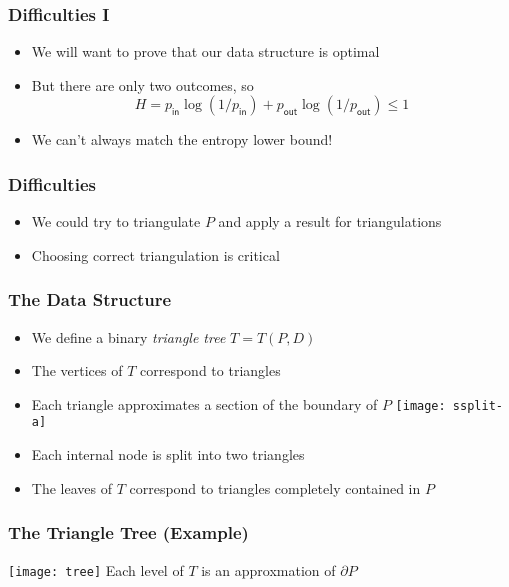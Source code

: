 \documentclass{beamer}
\newcommand{\pin}{p_{\mathsf{in}}}
\newcommand{\pout}{p_{\mathsf{out}}}
\begin{document}
\frame
{
   \frametitle{Difficulties I}
   \begin{itemize}
   \item<1-> We will want to prove that our data structure is optimal
   \item<2-> But there are only two outcomes, so
     \[ H= \pin\log (1/\pin) + \pout\log(1/\pout) \le 1  \]
   \item<3-> We can't always match the entropy lower bound!
   \end{itemize}
}

\frame
{
   \frametitle{Difficulties}
   \begin{itemize}
     \item<1-> We could try to triangulate $P$ and apply a result for 
	triangulations\\
     \item<4-> Choosing correct triangulation is critical
   \end{itemize}
}

\frame
{
   \frametitle{The Data Structure}
   \begin{itemize}
    \item<1-> We define a binary \emph{triangle tree} $T=T(P,D)$
    \item<2-> The vertices of $T$ correspond to triangles
    \item<3-> Each triangle approximates a section of the boundary of $P$
    {\texttt{[image: ssplit-a]}}
    \item<4-> Each internal node is split into two triangles
    \item<8-> The leaves of $T$ correspond to triangles completely
	contained in $P$
   \end{itemize}
}

\frame
{
   \frametitle{The Triangle Tree (Example)}
   \texttt{[image: tree]}
   Each level of $T$ is an approxmation of $\partial P$
}
\end{document}
